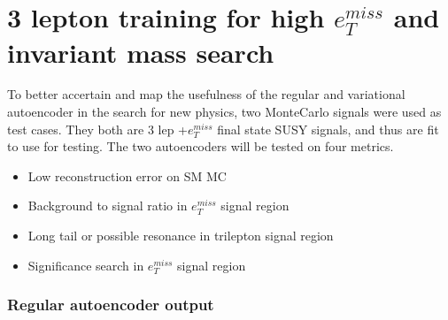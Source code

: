 
\section{3 lepton training for high $e_T^{miss}$ and invariant mass search}\label{sec:3lep}


To better accertain and map the usefulness of the regular and variational autoencoder in the search for 
new physics, two MonteCarlo signals were used as test cases. They both are 3 lep +$e_T^{miss}$ final state SUSY signals,
and thus are fit to use for testing. The two autoencoders will be tested on four metrics. 
\begin{itemize}
    \item Low reconstruction error on SM MC
    \item Background to signal ratio in $e_T^{miss}$ signal region
    \item Long tail or possible resonance in trilepton signal region
    \item Significance search in $e_T^{miss}$ signal region
\end{itemize}



\subsubsection*{Regular autoencoder output}


